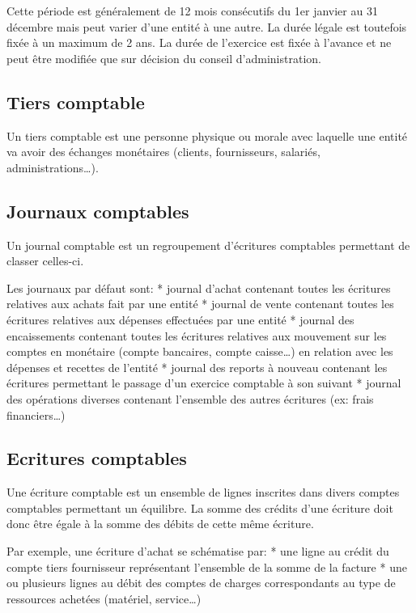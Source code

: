 \documentclass[a4paper,10pt,oneside,french]{sphinxmanual}
\begin{document}
Cette période est généralement de 12 mois consécutifs du 1er janvier au 31 décembre mais peut varier
d’une entité à une autre. La durée légale est toutefois fixée à un
maximum de 2 ans. La durée de l’exercice est fixée à l’avance et ne
peut être modifiée que sur décision du conseil d’administration.


\subsection{Tiers comptable}
\label{\detokenize{accounting/definition:tiers-comptable}}
Un tiers comptable est une personne physique ou morale avec
laquelle une entité va avoir des échanges monétaires (clients,
fournisseurs, salariés, administrations…).


\subsection{Journaux comptables}
\label{\detokenize{accounting/definition:journaux-comptables}}
Un journal comptable est un regroupement d’écritures comptables permettant de classer celles-ci.

Les journaux par défaut sont:
* journal d’achat contenant toutes les écritures relatives aux achats fait par une entité
* journal de vente contenant toutes les écritures relatives aux dépenses effectuées par une entité
* journal des encaissements contenant toutes les écritures relatives aux mouvement sur les comptes en monétaire (compte bancaires, compte caisse…) en relation avec les dépenses et recettes de l’entité
* journal des reports à nouveau contenant les écritures permettant le passage d’un exercice comptable à son suivant
* journal des opérations diverses contenant l’ensemble des autres écritures (ex: frais financiers…)


\subsection{Ecritures comptables}
\label{\detokenize{accounting/definition:ecritures-comptables}}
Une écriture comptable est un ensemble de lignes inscrites dans divers
comptes comptables permettant un équilibre.
La somme des crédits d’une écriture doit donc être égale à la somme des débits de cette même écriture.

Par exemple, une écriture d’achat se schématise par:
* une ligne au crédit du compte tiers fournisseur représentant l’ensemble de la somme de la facture
* une ou plusieurs lignes au débit des comptes de charges correspondants au type de ressources achetées (matériel, service…)
\end{document}
